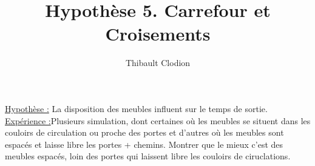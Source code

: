 \documentclass[12pt]{article}
\title{Hypothèse 5. Carrefour et Croisements}
\author{Thibault Clodion}
\begin{document}
\maketitle %

\underline{Hypothèse :} La disposition des meubles influent sur le temps de sortie.
\newline\newline
\underline{Expérience :}Plusieurs simulation, dont certaines où les meubles se situent dans les couloirs de circulation ou proche des portes et d'autres où les meubles sont espacés et laisse libre les portes + chemins.
\newline
Montrer que le mieux c'est des meubles espacés, loin des portes qui laissent libre les couloirs de ciruclations.
\newline\newline
\end{document}
